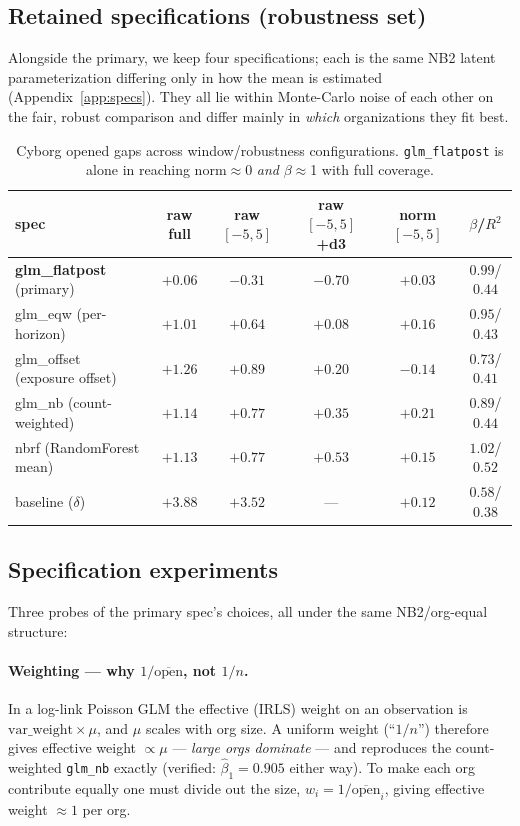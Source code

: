 \documentclass[11pt]{article}
\begin{document}
\subsection{Retained specifications (robustness set)}
Alongside the primary, we keep four specifications; each is the same NB2 latent parameterization differing only in how the mean is estimated (Appendix~\ref{app:specs}). They all lie within Monte-Carlo noise of each other on the fair, robust comparison and differ mainly in \emph{which} organizations they fit best.
\begin{table}[h]\centering\small
\begin{tabular}{lccccc}
\toprule
spec & raw full & raw $[-5,5]$ & raw $[-5,5]$+d3 & norm $[-5,5]$ & $\beta$/$R^2$\\
\midrule
\textbf{glm\_flatpost} (primary) & $+0.06$ & $-0.31$ & $-0.70$ & $\mathbf{+0.03}$ & $0.99$/$0.44$\\
glm\_eqw (per-horizon)           & $+1.01$ & $+0.64$ & $+0.08$ & $+0.16$ & $0.95$/$0.43$\\
glm\_offset (exposure offset)    & $+1.26$ & $+0.89$ & $+0.20$ & $-0.14$ & $0.73$/$0.41$\\
glm\_nb (count-weighted)         & $+1.14$ & $+0.77$ & $+0.35$ & $+0.21$ & $0.89$/$0.44$\\
nbrf (RandomForest mean)         & $+1.13$ & $+0.77$ & $+0.53$ & $+0.15$ & $1.02$/$0.52$\\
baseline ($\delta$)              & $+3.88$ & $+3.52$ & --- & $+0.12$ & $0.58$/$0.38$\\
\bottomrule
\end{tabular}
\caption{Cyborg opened gaps across window/robustness configurations. \texttt{glm\_flatpost} is alone in reaching norm$\approx$0 \emph{and} $\beta\approx$1 with full coverage.}
\end{table}

\subsection{Specification experiments}\label{sec:specexp}
Three probes of the primary spec's choices, all under the same NB2/org-equal structure:

\paragraph{Weighting --- why $1/\overline{\text{open}}$, not $1/n$.} In a log-link Poisson GLM the effective (IRLS) weight on an observation is $\text{var\_weight}\times\mu$, and $\mu$ scales with org size. A uniform weight (``$1/n$'') therefore gives effective weight $\propto\mu$ --- \emph{large orgs dominate} --- and reproduces the count-weighted \texttt{glm\_nb} exactly (verified: $\hat\beta_1=0.905$ either way). To make each org contribute equally one must divide out the size, $w_i=1/\overline{\text{open}}_i$, giving effective weight $\approx1$ per org.
\end{document}

